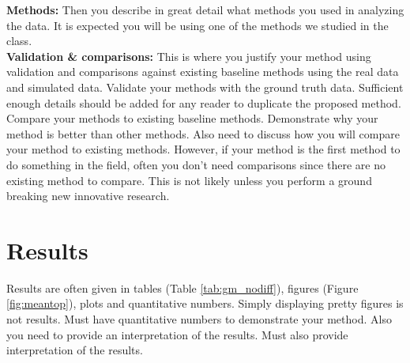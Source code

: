 \documentclass[12pt,portrait]{article}
\begin{document}
{\bf Methods:}  Then you describe in great detail what methods you used in analyzing the data.  It is expected you will be using one of the methods we studied in the class. \\

{\bf Validation \& comparisons:} This is where you justify your method using validation and comparisons against existing baseline methods using the real data and simulated data. Validate your methods with the ground truth data. Sufficient enough details should be added for any reader to duplicate the proposed method. Compare your methods to existing baseline methods. Demonstrate why your method is better than other methods. Also need to discuss how you will compare your method to existing methods. However, if your method is the first method to do something in the field, often you don't need comparisons since there are no existing method to compare. This is not likely unless you perform a ground breaking new innovative research. 


\section{Results}
Results are often given in tables (Table \ref{tab:gm_nodiff}), figures (Figure \ref{fig:meantop}), plots and quantitative numbers. Simply displaying pretty figures is not results. Must have quantitative numbers to demonstrate your method. Also you need to provide an interpretation of the results. Must also provide interpretation of the results. 
\end{document}
